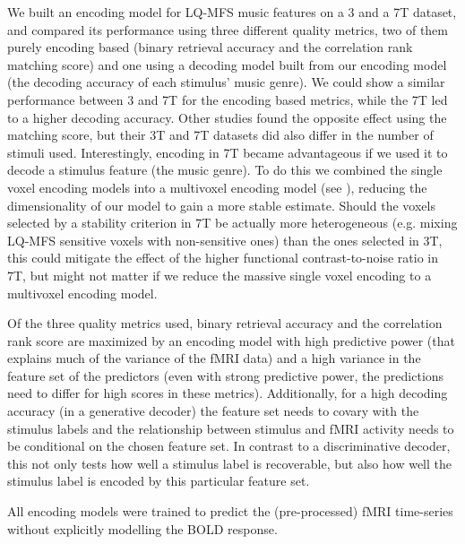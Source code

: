 We built an encoding model for LQ-MFS music features on a 3 and a 7T dataset, and compared its performance using three different quality metrics, two of them purely encoding based (binary retrieval accuracy and the correlation rank matching score) and one using a decoding model built from our encoding model (the decoding accuracy of each stimulus' music genre). We could show a similar performance between 3 and 7T for the encoding based metrics, while the 7T led to a higher decoding accuracy. Other studies \cite{SF14} found the opposite effect using the matching score, but their 3T and 7T datasets did also differ in the number of stimuli used. Interestingly, encoding in 7T became advantageous if we used it to decode a stimulus feature (the music genre). To do this we combined the single voxel encoding models into a multivoxel encoding model (see \cite{NG09}), reducing the dimensionality of our model to gain a more stable estimate. Should the voxels selected by a stability criterion in 7T be actually more heterogeneous (e.g. mixing LQ-MFS sensitive voxels with non-sensitive ones) than the ones selected in 3T, this could mitigate the effect of the higher functional contrast-to-noise ratio in 7T, but might not matter if we reduce the massive single voxel encoding to a multivoxel encoding model.

Of the three quality metrics used, binary retrieval accuracy and the correlation rank score are maximized by an encoding model with high predictive power (that explains much of the variance of the f{MRI} data) and a high variance in the feature set of the predictors (even with strong predictive power, the predictions need to differ for high scores in these metrics). Additionally, for a high decoding accuracy (in a generative decoder) the feature set needs to covary with the stimulus labels and the relationship between stimulus and f{MRI} activity needs to be conditional on the chosen feature set. In contrast to a discriminative decoder, this not only tests how well a stimulus label is recoverable, but also how well the stimulus label is encoded by this particular feature set.

All encoding models were trained to predict the (pre-processed) f{MRI} time-series without explicitly modelling the BOLD response. 





